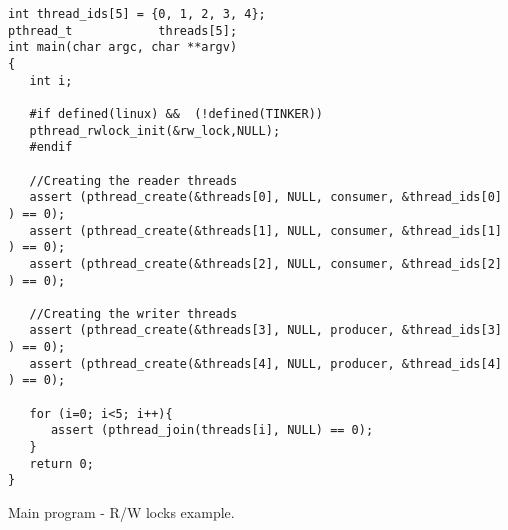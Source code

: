 \begin{table}[!hbp]
\begin{verbatim}
int thread_ids[5] = {0, 1, 2, 3, 4};
pthread_t            threads[5]; 
int main(char argc, char **argv)
{ 
   int i;

   #if defined(linux) &&  (!defined(TINKER))
   pthread_rwlock_init(&rw_lock,NULL);
   #endif

   //Creating the reader threads
   assert (pthread_create(&threads[0], NULL, consumer, &thread_ids[0] ) == 0);
   assert (pthread_create(&threads[1], NULL, consumer, &thread_ids[1] ) == 0);
   assert (pthread_create(&threads[2], NULL, consumer, &thread_ids[2] ) == 0);

   //Creating the writer threads
   assert (pthread_create(&threads[3], NULL, producer, &thread_ids[3] ) == 0);
   assert (pthread_create(&threads[4], NULL, producer, &thread_ids[4] ) == 0);

   for (i=0; i<5; i++){
      assert (pthread_join(threads[i], NULL) == 0);
   }
   return 0;
}

\end{verbatim}
\caption{Main program - R/W locks example.\label{rwl_main}}
\end{table}


